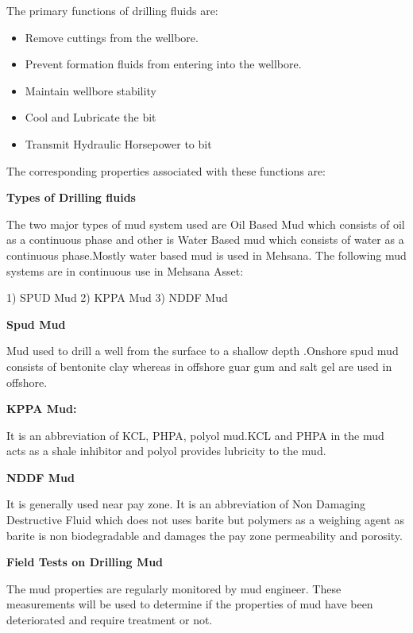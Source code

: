 \documentclass[11pt,a4paper]{article}
\begin{document}
The primary functions of drilling fluids are:

\begin{itemize}

\item Remove cuttings from the wellbore.
\item Prevent formation fluids from entering into the wellbore.
\item Maintain wellbore stability
\item Cool and Lubricate the bit
\item Transmit Hydraulic Horsepower to bit

\end{itemize}

The corresponding properties associated with these functions are:
%
%
%
%

\textbf{Types of Drilling fluids}

The two major types of mud system used are Oil Based Mud which consists of oil as a continuous phase and other is Water Based mud which consists of water as a continuous phase.Mostly water based mud is used in Mehsana. The following mud systems are in continuous use in Mehsana Asset:

1) SPUD Mud
2) KPPA Mud
3) NDDF Mud

\textbf{Spud Mud}

Mud used to drill a well from the surface to a shallow depth .Onshore spud mud consists of bentonite clay whereas in offshore guar gum and salt gel are used in offshore.

\textbf{KPPA Mud:}

It is an abbreviation of KCL, PHPA, polyol mud.KCL and PHPA in the mud acts as a shale inhibitor and polyol provides lubricity to the mud.

\textbf{NDDF Mud}

It is generally used near pay zone. It is an abbreviation of Non Damaging Destructive Fluid which does not uses barite but polymers as a weighing agent as barite is non biodegradable and damages the pay zone permeability and porosity.

\textbf{Field Tests on Drilling Mud}

The mud properties are regularly monitored by mud engineer. These measurements will be used to determine if the properties of mud have been deteriorated and require treatment or not.
\end{document}

